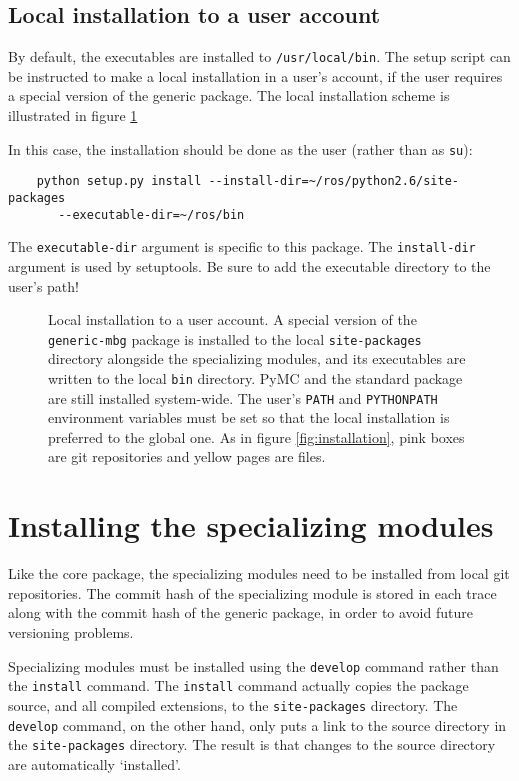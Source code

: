 \subsection{Local installation to a user account}
\label{sub:core-local} 
By default, the executables are installed to \texttt{/usr/local/bin}. The setup script can be instructed to make a local installation in a user's account, if the user requires a special version of the generic package. The local installation scheme is illustrated in figure \ref{fig:local-installation} 

In this case, the installation should be done as the user (rather than as \texttt{su}):
\begin{verbatim}
    python setup.py install --install-dir=~/ros/python2.6/site-packages
       --executable-dir=~/ros/bin 
\end{verbatim}
The \texttt{executable-dir} argument is specific to this package. The \texttt{install-dir} argument is used by setuptools. Be sure to add the executable directory to the user's path!

\begin{figure}[hhh]
    \begin{center}
    \end{center}
    \caption{Local installation to a user account. A special version of the \texttt{generic-mbg} package is installed to the local \texttt{site-packages} directory alongside the specializing modules, and its executables are written to the local \texttt{bin} directory. PyMC and the standard package are still installed system-wide. The user's \texttt{PATH} and \texttt{PYTHONPATH} environment variables must be set so that the local installation is preferred to the global one. As in figure \ref{fig:installation}, pink boxes are git repositories and yellow pages are files.}
    \label{fig:local-installation}
\end{figure}

\section{Installing the specializing modules}
\label{sec:spec-local} 
Like the core package, the specializing modules need to be installed from local git repositories. The commit hash of the specializing module is stored in each trace along with the commit hash of the generic package, in order to avoid future versioning problems.

\medskip
Specializing modules must be installed using the \texttt{develop} command rather than the \texttt{install} command. The \texttt{install} command actually copies the package source, and all compiled extensions, to the \texttt{site-packages} directory. The \texttt{develop} command, on the other hand, only puts a link to the source directory in the \texttt{site-packages} directory. The result is that changes to the source directory are automatically `installed'.

